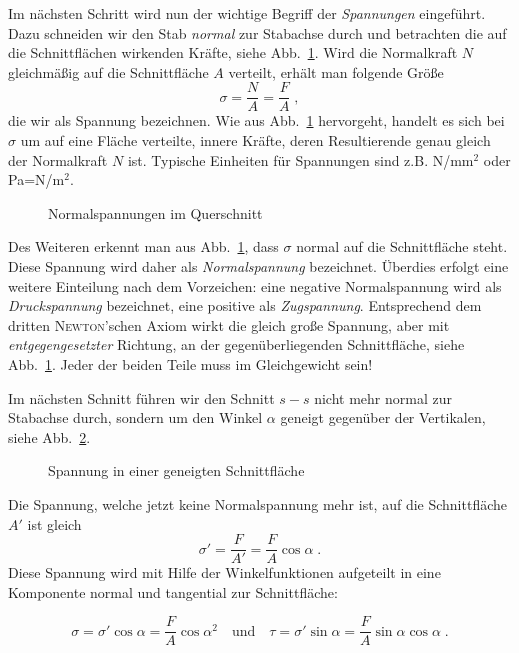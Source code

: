 Im nächsten Schritt wird nun der wichtige Begriff der \emph{Spannungen} eingeführt.
Dazu schneiden wir den Stab \emph{normal} zur Stabachse durch und betrachten die auf die Schnittflächen wirkenden Kräfte, siehe Abb.~\ref{fig:1-2}.
Wird die Normalkraft $N$ gleichmäßig auf die Schnittfläche $A$ verteilt, erhält man folgende Größe
%
\begin{equation}
\sigma = \dfrac{N}{A} = \dfrac{F}{A} \; ,
\label{eq:1-1}
\end{equation}
%
die wir als Spannung bezeichnen.
Wie aus Abb.~\ref{fig:1-2} hervorgeht, handelt es sich bei $\sigma$ um auf eine Fläche verteilte, innere Kräfte, deren Resultierende genau gleich der Normalkraft $N$ ist.
Typische Einheiten für Spannungen sind z.B. N/mm$^2$ oder Pa=N/m$^2$.
%
\begin{figure}[h!]
	\centering
	
	\caption{Normalspannungen im Querschnitt}
	\label{fig:1-2}
\end{figure}
%
Des Weiteren erkennt man aus Abb.~\ref{fig:1-2}, dass $\sigma$ normal auf die Schnittfläche steht.
Diese Spannung wird daher als \emph{Normalspannung} bezeichnet.
Überdies erfolgt eine weitere Einteilung nach dem Vorzeichen: eine negative Normalspannung wird als \emph{Druckspannung} bezeichnet, eine positive als \emph{Zugspannung}.
Entsprechend dem dritten \textsc{Newton}'schen Axiom wirkt die gleich große Spannung, aber mit \emph{entgegengesetzter} Richtung, an der gegenüberliegenden Schnittfläche, siehe Abb.~\ref{fig:1-2}.
Jeder der beiden Teile muss im Gleichgewicht sein!

Im nächsten Schnitt führen wir den Schnitt $s-s$ nicht mehr normal zur Stabachse durch, sondern um den Winkel $\alpha$ geneigt gegenüber der Vertikalen, siehe Abb.~\ref{fig:1-3}. 
%
\begin{figure}[h!]
	\centering
	
	\caption{Spannung in einer geneigten Schnittfläche}
	\label{fig:1-3}
\end{figure}
%
Die Spannung, welche jetzt keine Normalspannung mehr ist, auf die Schnittfläche $A'$ ist gleich
%
\begin{equation}
\sigma' = \dfrac{F}{A'} = \dfrac{F}{A}\cos\alpha \; .
\label{eq:1-3}
\end{equation}
%
Diese Spannung wird mit Hilfe der Winkelfunktionen aufgeteilt in eine Komponente normal und tangential zur Schnittfläche:

\begin{equation}
\sigma = \sigma'\cos\alpha = \dfrac{F}{A}\cos{\alpha}^2
\quad \text{und} \quad
\tau = \sigma'\sin\alpha = \dfrac{F}{A}\sin\alpha\cos\alpha \; .
\label{eq:1-4}
\end{equation}

